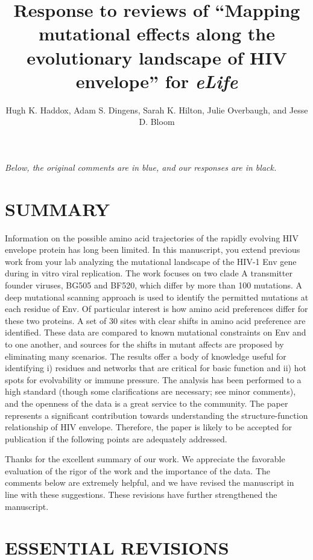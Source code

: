 \documentclass[11pt, oneside]{article}   	%
\title{Response to reviews of ``Mapping mutational effects along the evolutionary landscape of HIV envelope'' for \textit{eLife}}
\author{Hugh K. Haddox, Adam S. Dingens, Sarah K. Hilton, Julie Overbaugh, and Jesse D. Bloom}
\begin{document}
\maketitle

\emph{Below, the original comments {\color{blue} are in blue}, and our responses are in black.}

\color{blue}

\section*{SUMMARY} 

Information on the possible amino acid trajectories of the rapidly evolving HIV envelope protein has long been limited. In this manuscript, you extend previous work from your lab analyzing the mutational landscape of the HIV-1 Env gene during in vitro viral replication. The work focuses on two clade A transmitter founder viruses, BG505 and BF520, which differ by more than 100 mutations. A deep mutational scanning approach is used to identify the permitted mutations at each residue of Env. Of particular interest is how amino acid preferences differ for these two proteins. A set of 30 sites with clear shifts in amino acid preference are identified. These data are compared to known mutational constraints on Env and to one another, and sources for the shifts in mutant affects are proposed by eliminating many scenarios. The results offer a body of knowledge useful for identifying i) residues and networks that are critical for basic function and ii) hot spots for evolvability or immune pressure. The analysis has been performed to a high standard (though some clarifications are necessary; see minor comments), and the openness of the data is a great service to the community. The paper represents a significant contribution towards understanding the structure-function relationship of HIV envelope. Therefore, the paper is likely to be accepted for publication if the following points are adequately addressed. 

{\color{black}
Thanks for the excellent summary of our work.
We appreciate the favorable evaluation of the rigor of the work and the importance of the data.
The comments below are extremely helpful, and we have revised the manuscript in line with these suggestions.
These revisions have further strengthened the manuscript.
}

\section*{ESSENTIAL REVISIONS} 
\end{document}
